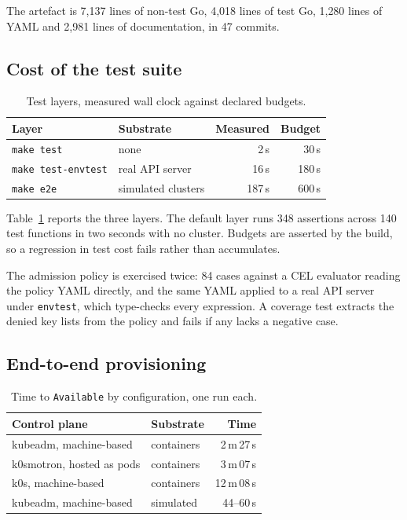 \documentclass[conference]{IEEEtran}
\begin{document}
The artefact is 7{,}137 lines of non-test Go, 4{,}018 lines of test Go, 1{,}280
lines of YAML and 2{,}981 lines of documentation, in 47 commits.

\subsection{Cost of the test suite}

\begin{table}[t]
\caption{Test layers, measured wall clock against declared budgets.}
\label{tab:tests}
\centering
\begin{tabular}{@{}llrr@{}}
\toprule
Layer & Substrate & Measured & Budget \\
\midrule
\texttt{make test} & none & 2\,s & 30\,s \\
\texttt{make test-envtest} & real API server & 16\,s & 180\,s \\
\texttt{make e2e} & simulated clusters & 187\,s & 600\,s \\
\bottomrule
\end{tabular}
\end{table}

Table~\ref{tab:tests} reports the three layers. The default layer runs 348
assertions across 140 test functions in two seconds with no cluster. Budgets are
asserted by the build, so a regression in test cost fails rather than accumulates.

The admission policy is exercised twice: 84 cases against a CEL evaluator reading
the policy YAML directly, and the same YAML applied to a real API server under
\texttt{envtest}, which type-checks every expression. A coverage test extracts the
denied key lists from the policy and fails if any lacks a negative case.

\subsection{End-to-end provisioning}

\begin{table}[t]
\caption{Time to \texttt{Available} by configuration, one run each.}
\label{tab:e2e}
\centering
\begin{tabular}{@{}llr@{}}
\toprule
Control plane & Substrate & Time \\
\midrule
kubeadm, machine-based & containers & 2\,m\,27\,s \\
k0smotron, hosted as pods & containers & 3\,m\,07\,s \\
k0s, machine-based & containers & 12\,m\,08\,s \\
kubeadm, machine-based & simulated & 44--60\,s \\
\bottomrule
\end{tabular}
\end{table}
\end{document}
